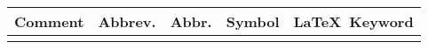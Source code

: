 \pagestyle{empty}


\begin{nochess}
\begin{center}
\begin{tabular}{|c|c|c|c|l|}\hline
Comment & Abbrev.& Abbr. & Symbol & \LaTeX\ Keyword \\ \hline \hline

 & & & & \\ \hline
\end{tabular}
\end{center}
\end{nochess}



